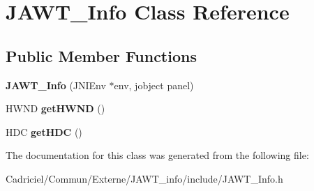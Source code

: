 \hypertarget{class_j_a_w_t___info}{\section{J\-A\-W\-T\-\_\-\-Info Class Reference}
\label{class_j_a_w_t___info}
}
\subsection*{Public Member Functions}
\begin{DoxyCompactItemize}
\item 
\hypertarget{class_j_a_w_t___info_a4e3733bebccef28b59e17dc9d540d46d}{{\bfseries J\-A\-W\-T\-\_\-\-Info} (J\-N\-I\-Env $\ast$env, jobject panel)}\label{class_j_a_w_t___info_a4e3733bebccef28b59e17dc9d540d46d}

\item 
\hypertarget{class_j_a_w_t___info_a8a6d00ba985dd7fbeabc258bf5ec577e}{H\-W\-N\-D {\bfseries get\-H\-W\-N\-D} ()}\label{class_j_a_w_t___info_a8a6d00ba985dd7fbeabc258bf5ec577e}

\item 
\hypertarget{class_j_a_w_t___info_a4a5091a3e36923c94d54760ebfa24e53}{H\-D\-C {\bfseries get\-H\-D\-C} ()}\label{class_j_a_w_t___info_a4a5091a3e36923c94d54760ebfa24e53}

\end{DoxyCompactItemize}


The documentation for this class was generated from the following file\-:\begin{DoxyCompactItemize}
\item 
Cadriciel/\-Commun/\-Externe/\-J\-A\-W\-T\-\_\-info/include/J\-A\-W\-T\-\_\-\-Info.\-h\end{DoxyCompactItemize}
